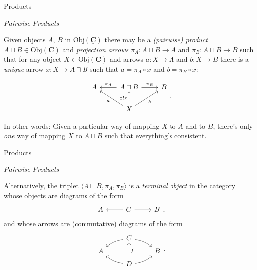 \documentclass[10pt]{beamer}
\newcommand{\Cat}[1]{\ensuremath{\underline{\mathbf{#1}}}}
\newcommand{\Obj}[1]{\ensuremath{\mathrm{Obj}(\Cat{#1})}}
\theoremstyle{definition}
\theoremstyle{remark}
\numberwithin{equation}{section}
\begin{document}
\begin{frame}[fragile]{Products}

  \emph{Pairwise Products}

  Given objects $A$, $B$ in $\Obj{C}$ there may be a \emph{(pairwise) product}
  $A\sqcap B \in \Obj{C}$ and \emph{projection arrows} $\pi_A \colon A \sqcap B \rightarrow A$ and $\pi_B
  \colon A \sqcap B \rightarrow B$ such that for any object $X \in \Obj{C}$ and arrows $a \colon X \rightarrow
  A$ and $b \colon X \rightarrow B$ there is a \emph{unique} arrow $x : X \rightarrow A \sqcap B$ such that $a = \pi_A \circ x$ and $b = \pi_B \circ x$:

  \[
  \begin{tikzcd}
    A & A\sqcap B \arrow[swap]{l}{\pi_{A}} \arrow{r}{\pi_{B}} & B \\
    & X \arrow[dotted]{u}{\exists! x} \arrow{ul}{a} \arrow[swap]{ur}{b} & 
  \end{tikzcd}\rlap{.}
  \]

  In other words: Given a particular way of mapping $X$ to $A$ and to $B$, there's only \emph{one} way of mapping $X$ to $A \sqcap B$ such that everything's consistent.


\end{frame}

\begin{frame}[fragile]{Products}

  \emph{Pairwise Products}

  Alternatively, the triplet $\langle {A \sqcap B, \pi_A, \pi_B} \rangle$ is a \emph{terminal object}
  in the category whose objects are diagrams of the form
  \[
    \begin{tikzcd}
      A & C \arrow{l} \arrow{r} & B
    \end{tikzcd}\rlap{,}
  \]
  and whose arrows are (commutative) diagrams of the form
  \[
    \begin{tikzcd}[row sep=tiny]
       & C \arrow[bend right=15]{dl} \arrow[bend left=15]{dr} & \\
      A & & B \\
       & D \arrow[bend left=15]{ul} \arrow[swap]{uu}{f} \arrow[bend right=15]{ur} & 
    \end{tikzcd}\rlap{.}
  \]

\end{frame}
\end{document}
